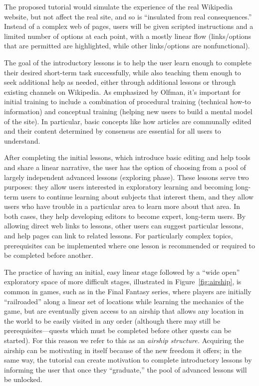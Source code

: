 \documentclass{acm_proc_article-sp}
\begin{document}
The proposed tutorial would simulate the experience of the real Wikipedia website, but not affect the real site, and so is ``insulated from real consequences.'' \cite{Garris:2002} Instead of a complex web of pages, users will be given scripted instructions and a limited number of options at each point, with a mostly linear flow (links/options that are permitted are highlighted, while other links/options are nonfunctional).

The goal of the introductory lessons is to help the user learn enough to complete their desired short-term task successfully, while also teaching them enough to seek additional help as needed, either through additional lessons or through existing channels on Wikipedia. As emphasized by Olfman,\cite{Olfman:1994} it's important for initial training to include a combination of procedural training (technical how-to information) and conceptual training (helping new users to build a mental model of the site). In particular, basic concepts like how articles are communally edited and their content determined by consensus are essential for all users to understand.

After completing the initial lessons, which introduce basic editing and help tools and share a linear narrative, the user has the option of choosing from a pool of largely independent advanced lessons (exploring phase). These lessons serve two purposes: they allow users interested in exploratory learning and becoming long-term users to continue learning about subjects that interest them, and they allow users who have trouble in a particular area to learn more about that area. In both cases, they help developing editors to become expert, long-term users. By allowing direct web links to lessons, other users can suggest particular lessons, and help pages can link to related lessons. For particularly complex topics, prerequisites can be implemented where one lesson is recommended or required to be completed before another.

The practice of having an initial, easy linear stage followed by a ``wide open'' exploratory space of more difficult stages, illustrated in Figure~\ref{fig:airship}, is common in games, such as in the Final Fantasy series, where players are initially ``railroaded'' along a linear set of locations while learning the mechanics of the game, but are eventually given access to an airship that allows any location in the world to be easily visited in any order (although there may still be prerequisites---quests which must be completed before other quests can be started). For this reason we refer to this as an \emph{airship structure.} Acquiring the airship can be motivating in itself because of the new freedom it offers; in the same way, the tutorial can create motivation to complete introductory lessons by informing the user that once they ``graduate,'' the pool of advanced lessons will be unlocked.
\end{document}
